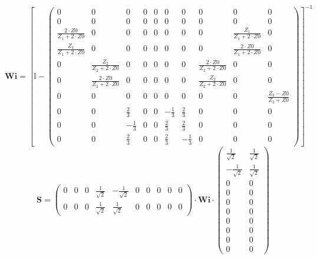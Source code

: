 \[ \mathbf{Wi} =  \left[ \mathbb{I}  - \left(\begin{smallmatrix} 0 & 0
& 0 & 0 & 0 & 0 & 0 & 0 & 0 & 0 \\ 0 & 0 & 0 & 0 & 0 & 0 & 0 & 0 & 0 &
0 \\ \frac{2\cdot Z0}{Z_1+2\cdot Z0} & 0 & 0 & 0 & 0 & 0 & 0 & 0 &
\frac{Z_1}{Z_1+2\cdot Z0} & 0 \\ \frac{Z_1}{Z_1+2\cdot Z0} & 0 & 0 & 0
& 0 & 0 & 0 & 0 & \frac{2\cdot Z0}{Z_1+2\cdot Z0} & 0 \\ 0 &
\frac{Z_2}{Z_2+2\cdot Z0} & 0 & 0 & 0 & 0 & 0 & \frac{2\cdot
Z0}{Z_2+2\cdot Z0} & 0 & 0 \\ 0 & \frac{2\cdot Z0}{Z_2+2\cdot Z0} & 0
& 0 & 0 & 0 & 0 & \frac{Z_2}{Z_2+2\cdot Z0} & 0 & 0 \\ 0 & 0 & 0 & 0 &
0 & 0 & 0 & 0 & 0 & \frac{ Z_3 -Z0}{ Z_3 +Z0} \\ 0 & 0 & \frac{2}{3} &
0 & 0 & -\frac{1}{3} & \frac{2}{3} & 0 & 0 & 0 \\ 0 & 0 & -\frac{1}{3}
& 0 & 0 & \frac{2}{3} & \frac{2}{3} & 0 & 0 & 0 \\ 0 & 0 & \frac{2}{3}
& 0 & 0 & \frac{2}{3} & -\frac{1}{3} & 0 & 0 & 0
\end{smallmatrix}\right) \right]^{-1}  \]
\[ \mathbf{S} = \left(\begin{smallmatrix} 0 & 0 & 0 &
\frac{1}{\sqrt{2}} & -\frac{1}{\sqrt{2}} & 0 & 0 & 0 & 0 & 0 \\ 0 & 0
& 0 & \frac{1}{\sqrt{2}} & \frac{1}{\sqrt{2}} & 0 & 0 & 0 & 0 & 0
\end{smallmatrix}\right) \cdot \mathbf{Wi}
\cdot\left(\begin{smallmatrix} \frac{1}{\sqrt{2}} & \frac{1}{\sqrt{2}}
\\ -\frac{1}{\sqrt{2}} & \frac{1}{\sqrt{2}} \\ 0 & 0 \\ 0 & 0 \\ 0 & 0
\\ 0 & 0 \\ 0 & 0 \\ 0 & 0 \\ 0 & 0 \\ 0 & 0 \end{smallmatrix}\right)
\]
